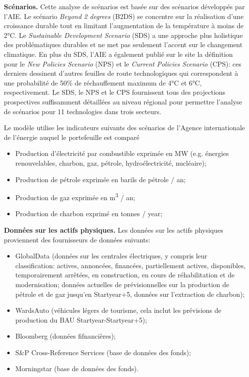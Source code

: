 \documentclass[10pt,table,a4]{article}\usepackage[]{graphicx}\usepackage[]{color}
\begin{document}
\begin{multicols}{2}
{		
		\textbf{Scénarios.} Cette analyse de scénarios est basée sur des scénarios développés par l'AIE. Le scénario \textit{Beyond 2 degrees} (B2DS) se concentre sur la réalisation d'une croissance durable tout en limitant l'augmentation de la température à moins de 2°C. Le \textit{Sustainable Development Scenario }(SDS) a une approche plus holistique des problématiques durables et ne met pas seulement l'accent sur le changement climatique. En plus du SDS, l'AIE a également publié sur le site la définition pour le \textit{New Policies Scenario} (NPS) et le \textit{Current Policies Scenario} (CPS): ces derniers dessinent d'autres feuilles de route technologiques qui correspondent à une probabilité de 50\% de réchauffement maximum de 4°C et 6°C, respectivement. Le SDS, le NPS et le CPS fournissent tous des projections prospectives suffisamment détaillées au niveau régional pour permettre l'analyse de scénarios pour 11 technologies dans trois secteurs. 
		
	Le modèle utilise les indicateurs suivants des scénarios de l'Agence internationale de l'énergie auquel le portefeuille est comparé
		\begin{itemize}
			\item{Production d'électricité par combustible exprimée en MW  (e.g. énergies renouvelables, charbon, gaz, pétrole, hydroélectricité, nucléaire);}
			\item{Production de pétrole exprimée en barils de pétrole  / an;}
			\item{Production de gaz exprimée en m\textsuperscript{3} / an;}
			\item{Production de charbon exprimé en tonnes  / year;}
		\end{itemize}
		
		 
		\textbf{Données sur les actifs physiques.} Les données sur les actifs physiques proviennent des fournisseurs de données suivants: 
		\begin{itemize}
			\item{GlobalData (données sur les centrales électriques, y compris leur classification: actives, annoncées, financées, partiellement actives, disponibles, temporairement arrêtées, en construction, en cours de réhabilitation et de modernisation; données actuelles de prévisionnelles sur la production de pétrole et de gaz jusqu'en Startyear+5, données sur l'extraction de charbon); }
			\item{WardsAuto (véhicules légers de tourisme, cela inclut les prévisions de production du BAU Startyear-Startyear+5); }
			\item{Bloomberg (données fifnancières);}
			\item{S\&P Cross-Reference Services (base de données des fonds);}
			\item{Morningstar (base de données des fonds). }
			

\end{itemize}}
\end{multicols}
\end{document}
